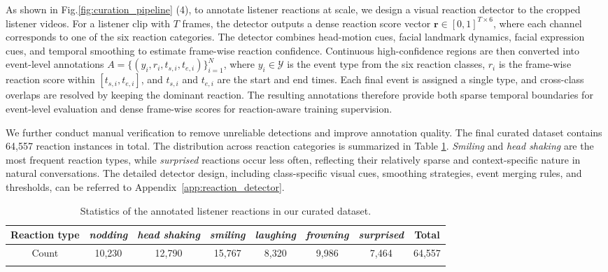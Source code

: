 As shown in Fig.\ref{fig:curation_pipeline} (4), to annotate listener reactions at scale, we design a visual reaction detector to the cropped listener videos. %
For a listener clip with $T$ frames, the detector outputs a dense reaction score vector $\mathbf{r} \in [0,1]^{T \times 6}$, where each channel corresponds to one of the six reaction categories. The detector combines head-motion cues, facial landmark dynamics, facial expression cues, and temporal smoothing to estimate frame-wise reaction confidence. 
Continuous high-confidence regions are then converted into event-level annotations
$A=\{(y_i,r_i,t_{s,i},t_{e,i})\}_{i=1}^{N}$, where $y_i\in\mathcal{Y}$ is the
event type from the six reaction classes, $r_i$ is the frame-wise reaction score
within $[t_{s,i},t_{e,i}]$, and $t_{s,i}$ and $t_{e,i}$ are the start and end
times. Each final event is assigned a single type, and cross-class overlaps are
resolved by keeping the dominant reaction. The resulting annotations therefore provide both sparse temporal boundaries for event-level evaluation and dense frame-wise scores for reaction-aware training supervision.

We further conduct manual verification to remove unreliable detections and improve annotation quality. The final curated dataset contains 64,557 reaction instances in total. The distribution across reaction categories is summarized in Table \ref{tab:reaction_statistics}. \textit{Smiling} and \textit{head shaking} are the most frequent reaction types, while \textit{surprised} reactions occur less often, reflecting their relatively sparse and context-specific nature in natural conversations. The detailed detector design, including class-specific visual cues, smoothing strategies, event merging rules, and thresholds, can be referred to Appendix~\ref{app:reaction_detector}.



\begin{table}[t]
    \centering
    \fontsize{8pt}{7pt}\selectfont
    \setcellgapes{1.5pt}
    \makegapedcells
    \setlength{\tabcolsep}{2pt} 
    \caption{Statistics of the annotated listener reactions in our curated dataset.}
    \label{tab:reaction_statistics}
    \begin{tabular}{c|cccccc|c}
        \Xhline{1.2pt}
        Reaction type & \textit{nodding} & \textit{head shaking} & \textit{smiling} & \textit{laughing} & \textit{frowning} & \textit{surprised} & Total \\
        \hline
        Count & 10,230 & 12,790 & 15,767 & 8,320 & 9,986 & 7,464 & 64,557 \\
        \Xhline{1.2pt}
    \end{tabular}
    \vspace{-1.5em}
\end{table}